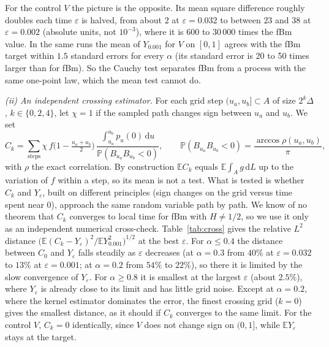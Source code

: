 \documentclass[11pt]{article}
\theoremstyle{remark}
\theoremstyle{definition}
\newcommand{\E}{\mathbb{E}}
\newcommand{\Prob}{\mathbb{P}}
\newcommand{\dd}{\,\mathrm{d}}
\begin{document}
For the control $V$ the picture is the opposite. Its mean square difference roughly doubles each time $\varepsilon$ is halved, from about $2$ at $\varepsilon=0.032$ to between $23$ and $38$ at $\varepsilon=0.002$ (absolute units, not $10^{-3}$), where it is 600 to 30\,000 times the fBm value. In the same runs the mean of $Y_{0.001}$ for $V$ on $[0,1]$ agrees with the fBm target within $1.5$ standard errors for every $\alpha$ (its standard error is 20 to 50 times larger than for fBm). So the Cauchy test separates fBm from a process with the same one-point law, which the mean test cannot do.

\emph{(ii) An independent crossing estimator.} For each grid step $(u_a,u_b]\subset A$ of size $2^k\Delta$, $k\in\{0,2,4\}$, let $\chi=1$ if the sampled path changes sign between $u_a$ and $u_b$. We set
\[
C_k=\sum_{\text{steps}}\chi\,f\big(1-\tfrac{u_a+u_b}{2}\big)\,\frac{\int_{u_a}^{u_b}p_u(0)\dd u}{\Prob(B_{u_a}B_{u_b}<0)},\qquad \Prob(B_{u_a}B_{u_b}<0)=\frac{\arccos\rho(u_a,u_b)}{\pi},
\]
with $\rho$ the exact correlation. By construction $\E C_k$ equals $\E\int_A g\dd L$ up to the variation of $f$ within a step, so its mean is not a test. What is tested is whether $C_k$ and $Y_\varepsilon$, built on different principles (sign changes on the grid versus time spent near $0$), approach the same random variable path by path. We know of no theorem that $C_k$ converges to local time for fBm with $H\neq1/2$, so we use it only as an independent numerical cross-check. Table~\ref{tab:cross} gives the relative $L^2$ distance $\big(\E(C_k-Y_\varepsilon)^2/\E Y_{0.001}^2\big)^{1/2}$ at the best $\varepsilon$. For $\alpha\le0.4$ the distance between $C_0$ and $Y_\varepsilon$ falls steadily as $\varepsilon$ decreases (at $\alpha=0.3$ from $40\%$ at $\varepsilon=0.032$ to $13\%$ at $\varepsilon=0.001$; at $\alpha=0.2$ from $54\%$ to $22\%$), so there it is limited by the slow convergence of $Y_\varepsilon$. For $\alpha\ge0.8$ it is smallest at the largest $\varepsilon$ (about $2.5\%$), where $Y_\varepsilon$ is already close to its limit and has little grid noise. Except at $\alpha=0.2$, where the kernel estimator dominates the error, the finest crossing grid ($k=0$) gives the smallest distance, as it should if $C_k$ converges to the same limit. For the control $V$, $C_k=0$ identically, since $V$ does not change sign on $(0,1]$, while $\E Y_\varepsilon$ stays at the target.
\end{document}
